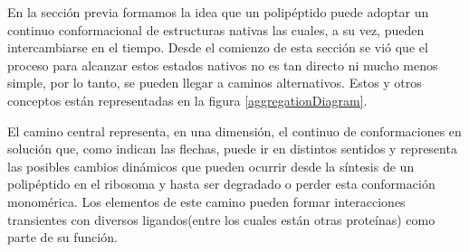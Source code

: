 % 



En la sección previa formamos la idea que un polipéptido puede adoptar un continuo conformacional de estructuras nativas las cuales, a su vez, pueden intercambiarse en el tiempo.
Desde el comienzo de esta sección se vió que el proceso para alcanzar estos estados nativos no es tan directo ni mucho menos simple, por lo tanto, se pueden llegar a caminos alternativos. 
Estos y otros conceptos están representadas en la figura \ref{aggregationDiagram}.

El camino central representa, en una dimensión, el continuo de conformaciones en solución que, como indican las flechas, puede ir en distintos sentidos y representa las posibles cambios dinámicos que pueden ocurrir desde la síntesis
de un polipéptido en el ribosoma y hasta ser degradado o perder esta conformación monomérica.
Los elementos de este camino pueden formar interacciones transientes con diversos ligandos(entre los cuales están otras proteínas) como parte de su función. 





